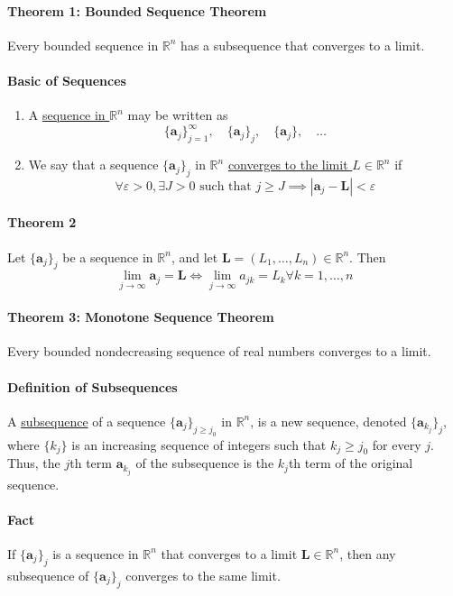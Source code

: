 \documentclass[11pt]{article}
\newcommand{\tb}[1]{\textbf{#1}}
\newcommand{\real}[0]{\mathbb{R}}
\newcommand{\under}[1]{\underline{#1}}
\newcommand{\va}[0]{\tb{a}}
\newcommand{\vL}[0]{\tb{L}}
\begin{document}
\paragraph{Theorem 1: Bounded Sequence Theorem} Every bounded sequence in $\real^n$ has a subsequence that converges to a limit.
\paragraph{Basic of Sequences}
\begin{enumerate}
	\item A \under{sequence in $\real^n$} may be written as
	$$\{\va_j\}_{j=1}^\infty, \quad \{\va_j\}_j, \quad \{\va_j\}, \quad \hdots$$
	\item We say that a sequence $\{\va_j\}_j$ in $\real^n$ \under{converges to the limit $L \in \real^n$} if
	$$ \forall \varepsilon > 0, \exists J > 0 \mbox{ such that } j\geq J \implies |\va_j - \vL| < \varepsilon$$
\end{enumerate}
\paragraph{Theorem 2} Let $\{\va_j\}_j$ be a sequence in $\real^n$, and let $\vL = (L_1, \hdots, L_n) \in \real^n$. Then
$$\underset{j\rightarrow\infty}{\lim} \va_j = \vL \iff \underset{j\rightarrow\infty}{\lim}a_{jk} = L_k \forall k = 1,\hdots,n$$

\paragraph{Theorem 3: Monotone Sequence Theorem} Every bounded nondecreasing sequence of real numbers converges to a limit.

\paragraph{Definition of Subsequences} A \under{subsequence} of a sequence $\{\va_j\}_{j\geq j_0}$ in $\real^n$, is a new sequence, denoted $\{\va_{k_j}\}_j$, where $\{k_j\}$ is an increasing sequence of integers such that $k_j \geq j_0$ for every $j$. Thus, the $j$th term $\va_{k_j}$ of the subsequence is the $k_j$th term of the original sequence.
\paragraph{Fact} If $\{\va_j\}_j$ is a sequence in $\real^n$ that converges to a limit $\vL \in \real^n$, then any subsequence of $\{\va_j\}_j$ converges to the same limit.
\end{document}
